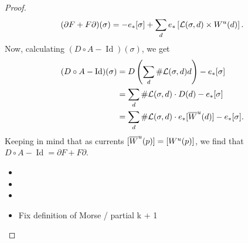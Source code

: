 \begin{proof}
    \[
        (\partial F + F \partial)(\sigma) = -e_* [\sigma] +\sum_{d} e_*\left[\mathcal L(\sigma, d) \times W^u(d)\right].
    \]
    Now, calculating $(D  \circ A - \operatorname{Id})(\sigma)$, we get
    \begin{align*}
        (D  \circ A - \operatorname{Id})(\sigma) &=
        D\left(\sum_d \# \mathcal L(\sigma, d) d\right) - e_*[\sigma]\\
        &= \sum_d \# \mathcal L(\sigma, d) \cdot D(d) - e_*[\sigma]\\
        &= \sum_d \# \mathcal L(\sigma, d) \cdot e_*[\overline{W}^u(d)] - e_*[\sigma]
    .\end{align*} 
    Keeping in mind that as currents $[\overline{W}^u(p)] = [W^u(p)]$, we find that $D  \circ  A - \operatorname{Id} = \partial F + F \partial$.

    \begin{itemize}
        \item {}
        \item {}
        \item {}
        \item Fix definition of Morse / partial k + 1
    \end{itemize}
\end{proof}

